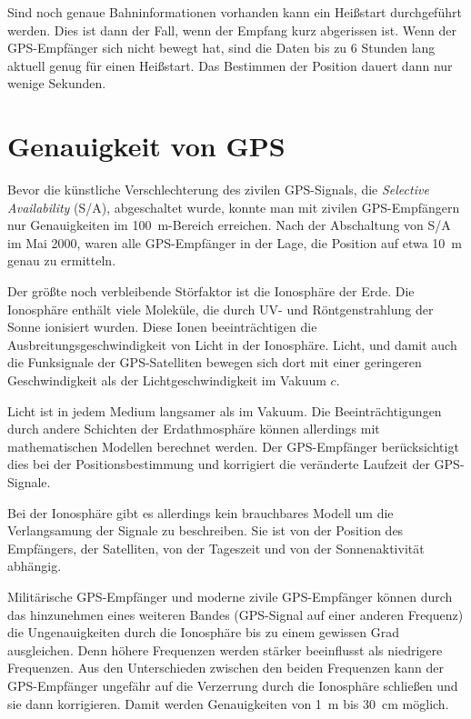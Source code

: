 \documentclass[12pt,a4paper]{scrartcl}
\begin{document}
Sind noch genaue Bahninformationen vorhanden kann ein Heißstart durchgeführt werden. Dies ist dann der Fall, wenn der Empfang kurz abgerissen ist. Wenn der GPS-Empfänger sich nicht bewegt hat, sind die Daten bis zu 6 Stunden lang aktuell genug für einen Heißstart. Das Bestimmen der Position dauert dann nur wenige Sekunden.

\section{Genauigkeit von GPS}
\label{sec:accuracy}

Bevor die künstliche Verschlechterung des zivilen GPS-Signals, die \emph{Selective Availability} (S/A), abgeschaltet wurde, konnte man mit zivilen GPS-Empfängern nur Genauigkeiten im \SI{100}{\meter}-Bereich erreichen. Nach der Abschaltung von S/A im Mai 2000, waren alle GPS-Empfänger in der Lage, die Position auf etwa \SI{10}{m} genau zu ermitteln.

Der größte noch verbleibende Störfaktor ist die Ionosphäre der Erde. Die Ionosphäre enthält viele Moleküle, die durch UV- und Röntgenstrahlung der Sonne ionisiert wurden. Diese Ionen beeinträchtigen die Ausbreitungsgeschwindigkeit von Licht in der Ionosphäre. Licht, und damit auch die Funksignale der GPS-Satelliten bewegen sich dort mit einer geringeren Geschwindigkeit als der Lichtgeschwindigkeit im Vakuum $c$.

Licht ist in jedem Medium langsamer als im Vakuum. Die Beeinträchtigungen durch andere Schichten der Erdathmosphäre können allerdings mit mathematischen Modellen berechnet werden. Der GPS-Empfänger berücksichtigt dies bei der Positionsbestimmung und korrigiert die veränderte Laufzeit der GPS-Signale.

Bei der Ionosphäre gibt es allerdings kein brauchbares Modell um die Verlangsamung der Signale zu beschreiben. Sie ist von der Position des Empfängers, der Satelliten, von der Tageszeit und von der Sonnenaktivität abhängig.

Militärische GPS-Empfänger und moderne zivile GPS-Empfänger können durch das hinzunehmen eines weiteren Bandes (GPS-Signal auf einer anderen Frequenz) die Ungenauigkeiten durch die Ionosphäre bis zu einem gewissen Grad ausgleichen. Denn höhere Frequenzen werden stärker beeinflusst als niedrigere Frequenzen. Aus den Unterschieden zwischen den beiden Frequenzen kann der GPS-Empfänger ungefähr auf die Verzerrung durch die Ionosphäre schließen und sie dann korrigieren. Damit werden Genauigkeiten von \SI{1}{\meter} bis \SI{30}{\centi\meter} möglich.
\end{document}
